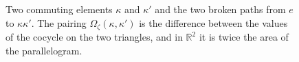\begin{figure}[ht]
	\centering
	\caption{Two commuting elements $\kappa$ and $\kappa'$ and the two broken paths from $e$ to $\kappa\kappa'$. The pairing $\Omega_\zeta(\kappa,\kappa')$ is the difference between the values of the cocycle on the two triangles, and in $\mathbb{R}^2$ it is twice the area of the parallelogram.}
	\label{fig:parallelogram}
\end{figure}

